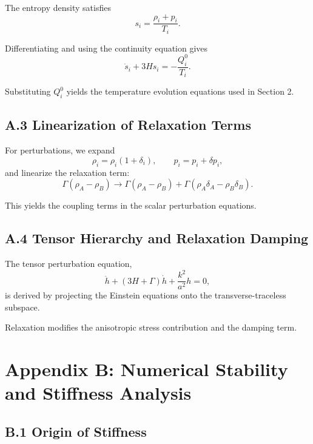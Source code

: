 \documentclass[11pt,a4paper]{article}
\begin{document}
The entropy density satisfies
\begin{equation}
s_i = \frac{\rho_i + p_i}{T_i}.
\end{equation}

Differentiating and using the continuity equation gives
\begin{equation}
\dot{s}_i + 3Hs_i = -\frac{Q^0_i}{T_i}.
\end{equation}

Substituting $Q^0_i$ yields the temperature evolution equations used in Section 2.

\subsection*{A.3 Linearization of Relaxation Terms}

For perturbations, we expand
\begin{equation}
\rho_i = \rho_i(1+\delta_i), \qquad p_i = p_i + \delta p_i,
\end{equation}
and linearize the relaxation term:
\begin{equation}
\Gamma(\rho_A - \rho_B)
\rightarrow
\Gamma(\rho_A - \rho_B)
+ \Gamma(\rho_A\delta_A - \rho_B\delta_B).
\end{equation}

This yields the coupling terms in the scalar perturbation equations.

\subsection*{A.4 Tensor Hierarchy and Relaxation Damping}

The tensor perturbation equation,
\begin{equation}
\ddot{h} + (3H + \Gamma)\dot{h} + \frac{k^2}{a^2}h = 0,
\end{equation}
is derived by projecting the Einstein equations onto the transverse-traceless subspace.

Relaxation modifies the anisotropic stress contribution and the damping term.

\section*{Appendix B: Numerical Stability and Stiffness Analysis}

\subsection*{B.1 Origin of Stiffness}
\end{document}
